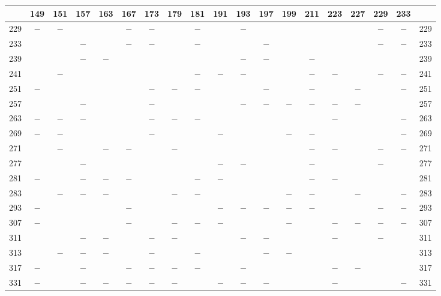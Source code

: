 \clearpage
{}%
\begin{center}\begingroup\fontsize{8}{10.5}\selectfont\setlength{\tabcolsep}{2pt}
\begin{tabular}{r|c|c|c|c|c|c|c|c|c|c|c|c|c|c|c|c|c|r}
\hline
 & 149 & 151 & 157 & 163 & 167 & 173 & 179 & 181 & 191 & 193 & 197 & 199 & 211 & 223 & 227 & 229 & 233 & \\
\hline
229 & $-$ & $-$ &  &  & $-$ & $-$ &  & $-$ &  & $-$ &  &  &  &  &  & $-$ & $-$ & 229\\
233 &  &  & $-$ &  & $-$ & $-$ &  & $-$ &  &  & $-$ &  &  &  &  & $-$ & $-$ & 233\\
239 &  &  & $-$ & $-$ &  &  &  &  &  & $-$ & $-$ &  & $-$ &  &  &  &  & 239\\
241 &  & $-$ &  &  &  &  &  & $-$ & $-$ & $-$ &  &  & $-$ & $-$ &  & $-$ & $-$ & 241\\
251 & $-$ &  &  &  &  & $-$ & $-$ & $-$ &  &  & $-$ &  & $-$ &  & $-$ &  & $-$ & 251\\
257 &  &  & $-$ &  &  & $-$ &  &  &  & $-$ & $-$ & $-$ & $-$ & $-$ & $-$ &  &  & 257\\
263 & $-$ & $-$ & $-$ &  &  & $-$ & $-$ & $-$ &  &  &  &  &  & $-$ &  &  & $-$ & 263\\
269 & $-$ & $-$ &  &  &  & $-$ &  &  & $-$ &  &  & $-$ & $-$ &  &  &  & $-$ & 269\\
271 &  & $-$ &  & $-$ & $-$ &  & $-$ &  &  &  &  &  & $-$ & $-$ &  & $-$ & $-$ & 271\\
277 &  &  & $-$ &  &  &  &  &  & $-$ & $-$ &  &  & $-$ &  &  & $-$ &  & 277\\
281 & $-$ &  & $-$ & $-$ & $-$ &  &  & $-$ & $-$ &  &  &  & $-$ & $-$ &  &  &  & 281\\
283 &  & $-$ & $-$ & $-$ &  &  & $-$ & $-$ &  &  &  & $-$ & $-$ &  & $-$ &  & $-$ & 283\\
293 & $-$ &  &  &  & $-$ &  &  &  & $-$ & $-$ & $-$ & $-$ & $-$ &  &  & $-$ & $-$ & 293\\
307 & $-$ &  &  &  & $-$ &  & $-$ & $-$ & $-$ &  &  & $-$ &  & $-$ & $-$ & $-$ & $-$ & 307\\
311 &  &  & $-$ & $-$ &  & $-$ & $-$ &  &  & $-$ & $-$ &  &  & $-$ &  & $-$ &  & 311\\
313 &  & $-$ & $-$ & $-$ &  & $-$ &  & $-$ &  &  & $-$ & $-$ &  &  &  &  &  & 313\\
317 & $-$ &  & $-$ &  & $-$ & $-$ & $-$ & $-$ &  & $-$ &  &  &  & $-$ & $-$ &  &  & 317\\
331 & $-$ &  & $-$ & $-$ & $-$ & $-$ & $-$ &  & $-$ & $-$ & $-$ &  &  & $-$ &  &  & $-$ & 331\\

\end{tabular}
\end{center}
